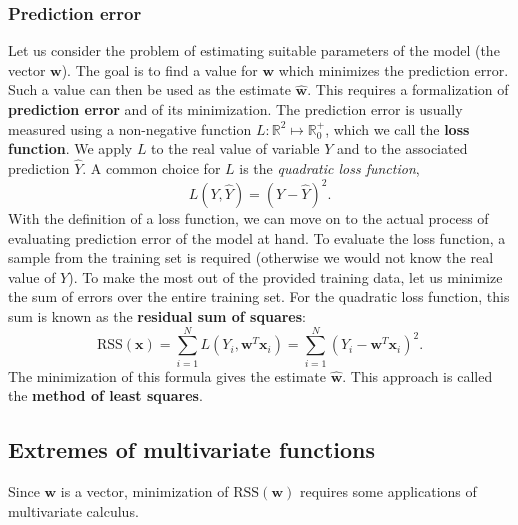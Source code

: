 \documentclass[a4paper]{article}
\begin{document}
	\subsubsection{Prediction error}
	Let us consider the problem of estimating suitable parameters of the model
	(the vector $\boldsymbol{w}$). The goal is to find a value for $\boldsymbol{w}$ which
	minimizes the prediction error. Such a value can then be used as the estimate
	$\hat{\boldsymbol{w}}$. This requires a formalization of \textbf{prediction error}
	and of its minimization. The prediction error is usually measured using a
	non-negative function $L: \mathbb{R}^2 \mapsto \mathbb{R}_0^+$, which we call
	the \textbf{loss function}. We apply $L$ to the real value of variable $Y$
	and to the associated prediction $\hat{Y}$. A common choice for $L$ is the
	\textit{quadratic loss function}, \[
		L(Y, \hat{Y}) = (Y - \hat{Y})^2
	.\] With the definition of a loss function, we can move on to the actual
	process of evaluating prediction error of the model at hand. To evaluate
	the loss function, a sample from the training set is required (otherwise
	we would not know the real value of $Y $). To make the most out of the
	provided training data, let us minimize the sum of errors over the entire
	training set. For the quadratic loss function, this sum is known as the
	\textbf{residual sum of squares}: \[
		\text{RSS}(\boldsymbol{x}) = \sum_{i = 1}^N L(Y_i, \boldsymbol{w}^T \boldsymbol{x}_i)
		           = \sum_{i = 1}^N \left( Y_i - \boldsymbol{w}^T \boldsymbol{x}_i \right)^2
	.\] The minimization of this formula gives the estimate $\hat{\boldsymbol{w}}$.
	This approach is called the \textbf{method of least squares}.

	\subsection{Extremes of multivariate functions}
	Since $\boldsymbol{w}$ is a vector, minimization of $\mathrm{RSS}(\boldsymbol{w})$ requires
	some applications of multivariate calculus.
\end{document}

